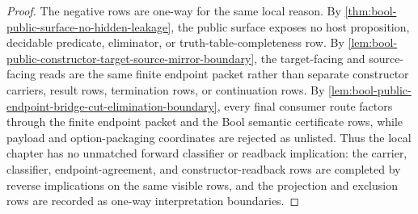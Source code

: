 \begin{proof}
The negative rows are one-way for the same local reason. By \autoref{thm:bool-public-surface-no-hidden-leakage}, the public surface exposes no host proposition, decidable predicate, eliminator, or truth-table-completeness row. By \autoref{lem:bool-public-constructor-target-source-mirror-boundary}, the target-facing and source-facing reads are the same finite endpoint packet rather than separate constructor carriers, result rows, termination rows, or continuation rows. By \autoref{lem:bool-public-endpoint-bridge-cut-elimination-boundary}, every final consumer route factors through the finite endpoint packet and the Bool semantic certificate rows, while payload and option-packaging coordinates are rejected as unlisted. Thus the local chapter has no unmatched forward classifier or readback implication: the carrier, classifier, endpoint-agreement, and constructor-readback rows are completed by reverse implications on the same visible rows, and the projection and exclusion rows are recorded as one-way interpretation boundaries.
\end{proof}

